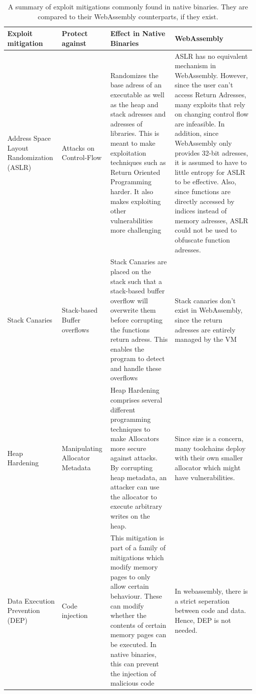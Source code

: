 \documentclass[sigconf]{acmart}
\begin{document}
\begin{table}
\begin{tabular}{p{2cm} | p{2cm} | p{6cm} | p{6cm} }
  \toprule
  Exploit mitigation & Protect against & Effect in Native Binaries & WebAssembly \\
  \midrule
  Address Space Layout Randomization (ASLR) & Attacks on Control-Flow & Randomizes the base adress of an executable as well as the heap and stack adresses and adresses of libraries. This is meant to make exploitation techniques such as Return Oriented Programming harder. It also makes exploiting other vulnerabilities more challenging& ASLR has no equivalent mechanism in WebAssembly. However, since the user can't access Return Adresses, many exploits that rely on changing control flow are infeasible. In addition, since WebAssembly only provides 32-bit adresses, it is assumed to have to little entropy for ASLR to be effective. Also, since functions are directly accessed by indices instead of memory adresses, ASLR could not be used to obfuscate function adresses. \\ \hline
   Stack Canaries & Stack-based Buffer overflows & Stack Canaries are placed on the stack such that a stack-based buffer overflow will overwrite them before corrupting the functions return adress. This enables the program to detect and handle these overflows & Stack canaries don't exist in WebAssembly, since the return adresses are entirely managed by the VM \\ \hline
   Heap Hardening & Manipulating Allocator Metadata & Heap Hardening comprises several different programming techniques to make Allocators more secure against attacks. By corrupting heap metadata, an attacker can use the allocator to execute arbitrary writes on the heap. & Since size is a concern, many toolchains deploy with their own smaller allocator which might have vulnerabilities.\\ \hline
   Data Execution Prevention (DEP) & Code injection & This mitigation is part of a family of mitigations which modify memory pages to only allow certain behaviour. These can modify whether the contents of certain memory pages can be executed. In native binaries, this can prevent the injection of malicious code & In webassembly, there is a strict seperation between code and data. Hence, DEP is not needed.
\bottomrule
\end{tabular}
\label{table:exploit_mitigation_wasm}
\caption{A summary of exploit mitigations commonly found in native binaries. They are compared to their WebAssembly counterparts, if they exist.}
\end{table}
\end{document}
